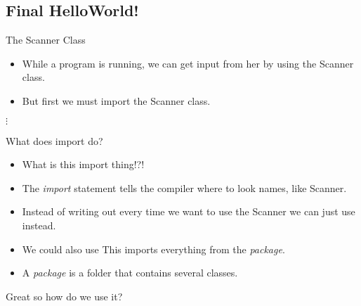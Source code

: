 \subsection{Final HelloWorld!}
\begin{frame}[fragile]{The Scanner Class}
\begin{itemize}
\item While a program is running, we can get input from her by using the Scanner class. \pause
\item But first we must import the Scanner class.
\end{itemize}
\begin{semiverbatim}\end{semiverbatim}

$\vdots$
\end{frame}

\begin{frame}{What does import do?}
\begin{itemize}
\item What is this import thing!?! \pause
\item The \emph{import} statement tells the compiler where to look names, like Scanner. \pause
\item Instead of writing out  every time we want to use the Scanner we can just use  instead. \pause
\item We could also use  This imports everything from the  \emph{package}.
\item A \emph{package} is a folder that contains several classes.
\end{itemize}
\end{frame}

\begin{frame}[fragile]{Great so how do we use it?}
\begin{semiverbatim}
\end{semiverbatim}
\end{frame}

